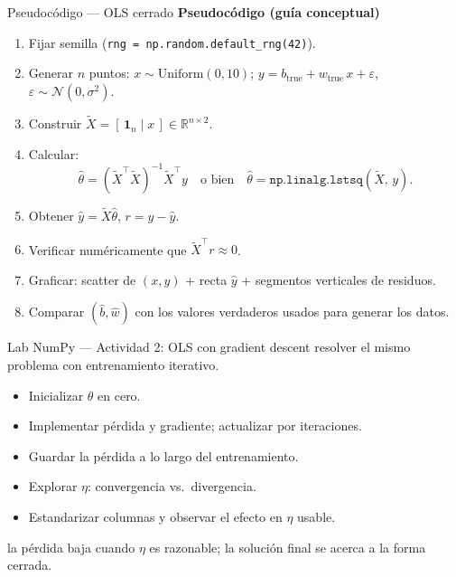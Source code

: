 \begin{frame}{Pseudocódigo — OLS cerrado}
\footnotesize
\textbf{Pseudocódigo (guía conceptual)}
\begin{enumerate}\footnotesize
  \item Fijar semilla (\texttt{rng = np.random.default\_rng(42)}).
  \item Generar $n$ puntos: $x\sim\mathrm{Uniform}(0,10)$;\; $y = b_{\mathrm{true}} + w_{\mathrm{true}}\,x + \varepsilon$,\; $\varepsilon\sim\mathcal{N}(0,\sigma^2)$.
  \item Construir $\tilde X = [\,\mathbf{1}_n \mid x\,]\in\mathbb{R}^{n\times 2}$.
  \item Calcular:
  \[
    \hat\theta = (\tilde X^\top \tilde X)^{-1}\tilde X^\top y
    \quad\text{o bien}\quad
    \hat\theta = \texttt{np.linalg.lstsq}(\tilde X,\, y).
  \]
  \item Obtener $\hat y = \tilde X\hat\theta$,\; $r = y - \hat y$.
  \item Verificar numéricamente que $\tilde X^\top r \approx 0$.
  \item Graficar: scatter de $(x,y)$ + recta $\hat y$ + segmentos verticales de residuos.
  \item Comparar $(\hat b,\hat w)$ con los valores verdaderos usados para generar los datos.
\end{enumerate}
\end{frame}

\begin{frame}{Lab NumPy — Actividad 2: OLS con gradient descent}
 resolver el mismo problema con entrenamiento iterativo.
\begin{itemize}\small
  \item Inicializar $\theta$ en cero.
  \item Implementar pérdida y gradiente; actualizar por iteraciones.
  \item Guardar la pérdida a lo largo del entrenamiento.
  \item Explorar $\eta$: convergencia vs.\ divergencia.
  \item Estandarizar columnas y observar el efecto en $\eta$ usable.
\end{itemize}

\vspace{0.2em}
la pérdida baja cuando $\eta$ es razonable; la solución final se acerca a la forma cerrada.
\end{frame}


